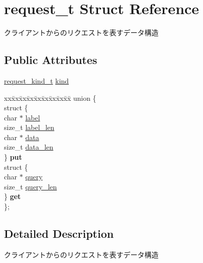 \hypertarget{structrequest__t}{}\section{request\+\_\+t Struct Reference}
\label{structrequest__t}


クライアントからのリクエストを表すデータ構造  


\subsection*{Public Attributes}
\begin{DoxyCompactItemize}
\item 
\hyperlink{unagi__server_8c_a30a7f6ee9120da0c95e8a1847b35a7a2}{request\+\_\+kind\+\_\+t} \hyperlink{structrequest__t_a5a7d278ddd3badff185070eea7ffdcf6}{kind}
\item 
\mbox{\label{structrequest__t_a9b5a412828b2bbcd17f1dd0758705025}} 
\begin{tabbing}
xx\=xx\=xx\=xx\=xx\=xx\=xx\=xx\=xx\=\kill
union \{\\
\>struct \{\\
\>\>char $\ast$ \hyperlink{structrequest__t_a29398274887826eaa815508fc159c4bb}{label}\\
\>\>size\_t \hyperlink{structrequest__t_a33f664c7c9218860358eb989281fd83d}{label\_len}\\
\>\>char $\ast$ \hyperlink{structrequest__t_aba523dc4fff06627bc840193fbafb949}{data}\\
\>\>size\_t \hyperlink{structrequest__t_a8e71192dcf1ff66483f6b4ae308f1c07}{data\_len}\\
\>\} {\bfseries put}\\
\>struct \{\\
\>\>char $\ast$ \hyperlink{structrequest__t_a1edf2a25f2884e581bd011c950ee6603}{query}\\
\>\>size\_t \hyperlink{structrequest__t_ae89af9417b7e6874716f2fe66d7112fe}{query\_len}\\
\>\} {\bfseries get}\\
\}; \\

\end{tabbing}\end{DoxyCompactItemize}


\subsection{Detailed Description}
クライアントからのリクエストを表すデータ構造 

